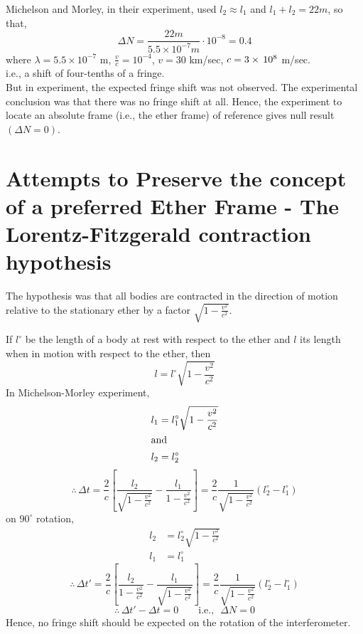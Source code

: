 \documentclass[../main-sheet.tex]{subfiles}
\begin{document}
Michelson and Morley, in their experiment, used \(l_2\approx l_1 \) and \(l_1+l_2=22 m \), so that,
\[\Delta N=\frac{22m }{5.5\times 10^{-7} m }\cdot10^{-8}=0.4\]
where \(\lambda=5.5\times 10^{-7}\) m, \(\frac{v }{c }=10^{-4}\), \(v=30\) km/sec, \(c=3\times\,10^{8}\) m/sec.\\
i.e., a shift of four-tenths of a fringe.\\
But in experiment, the expected fringe shift was not observed. The experimental conclusion was that there was no fringe shift at all. Hence, the experiment to locate an absolute frame (i.e., the ether frame) of reference gives null result \((\Delta N=0)\).
\section{Attempts to Preserve the concept of a preferred Ether Frame - The Lorentz-Fitzgerald contraction hypothesis}
The hypothesis was that all bodies are contracted in the direction of motion relative to the stationary ether by a factor \(\sqrt{1-\frac{v^2}{c^2}}\).

If \(l^\circ\) be the length of a body at rest with respect to the ether and \(l\) its length when in motion with respect to the ether, then
\[l=l^\circ\sqrt{1-\frac{v^2}{c^2}}\]
In Michelson-Morley experiment,
\begin{align*}
    l_1&=l_1^\circ\sqrt{1-\frac{v^2}{c^2}}\\
    \intertext{and}
    l_2&=l_2^\circ
\end{align*}
\[\therefore\,\Delta t=\frac{2 }{c}\left[ \frac{l_2 }{\sqrt{1-\frac{v^2}{c^2}}} -\frac{l_1}{1-\frac{v^2}{c^2}}\right]=\frac{2}{c }\frac{1}{\sqrt{1-\frac{v^2}{c^2}} }\left( l_2^\circ-l_1^\circ \right)\]
on \(90^\circ\) rotation,
\begin{align*}
    l_2&=l_2^\circ\sqrt{1-\frac{v^2}{c^2}}\\
    l_1&=l_1^\circ
\end{align*}
\[\therefore\,\Delta t'=\frac{2 }{c}\left[ \frac{l_2 }{1-\frac{v^2}{c^2}} -\frac{l_1}{\sqrt{1-\frac{v^2}{c^2}}}\right]=\frac{2}{c }\frac{1}{\sqrt{1-\frac{v^2}{c^2}} }\left( l_2^\circ-l_1^\circ \right)\]
\[\therefore\,\Delta t'-\Delta t=0\qquad\text{i.e., }\,\,\Delta N=0\]
Hence, no fringe shift should be expected on the rotation of the interferometer.
\end{document}
